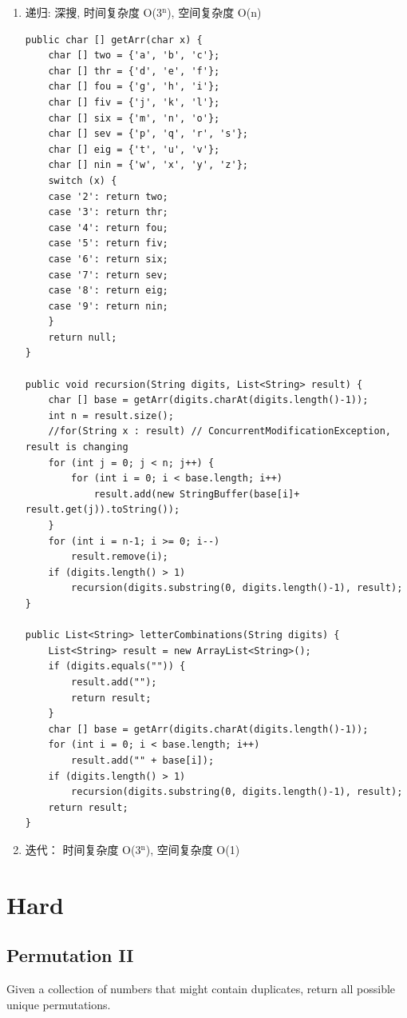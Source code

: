 \documentclass[12pt]{book}
\begin{document}
\begin{enumerate}
\item 递归: 深搜, 时间复杂度 O(3$^{\text{n}}$), 空间复杂度 O(n)
\label{sec-9-1-5-1}

\lstset{language=java,label= ,caption= ,numbers=none}
\begin{lstlisting}
public char [] getArr(char x) {
    char [] two = {'a', 'b', 'c'};
    char [] thr = {'d', 'e', 'f'};
    char [] fou = {'g', 'h', 'i'};
    char [] fiv = {'j', 'k', 'l'};
    char [] six = {'m', 'n', 'o'};
    char [] sev = {'p', 'q', 'r', 's'};
    char [] eig = {'t', 'u', 'v'};
    char [] nin = {'w', 'x', 'y', 'z'};
    switch (x) {
    case '2': return two;
    case '3': return thr;
    case '4': return fou;
    case '5': return fiv;
    case '6': return six;
    case '7': return sev;
    case '8': return eig;
    case '9': return nin;
    }
    return null;
}

public void recursion(String digits, List<String> result) {
    char [] base = getArr(digits.charAt(digits.length()-1));
    int n = result.size();
    //for(String x : result) // ConcurrentModificationException, result is changing
    for (int j = 0; j < n; j++) {
        for (int i = 0; i < base.length; i++)
            result.add(new StringBuffer(base[i]+ result.get(j)).toString());
    }
    for (int i = n-1; i >= 0; i--)
        result.remove(i);
    if (digits.length() > 1)
        recursion(digits.substring(0, digits.length()-1), result);
}

public List<String> letterCombinations(String digits) {
    List<String> result = new ArrayList<String>();
    if (digits.equals("")) {
        result.add("");
        return result;
    }
    char [] base = getArr(digits.charAt(digits.length()-1));
    for (int i = 0; i < base.length; i++) 
        result.add("" + base[i]);
    if (digits.length() > 1)
        recursion(digits.substring(0, digits.length()-1), result);
    return result;
}
\end{lstlisting}

\item 迭代： 时间复杂度 O(3$^{\text{n}}$), 空间复杂度 O(1)
\label{sec-9-1-5-2}
\end{enumerate}

\section{Hard}
\label{sec-9-2}
\subsection{Permutation II}
\label{sec-9-2-1}
Given a collection of numbers that might contain duplicates, return all possible unique permutations.
\end{document}
